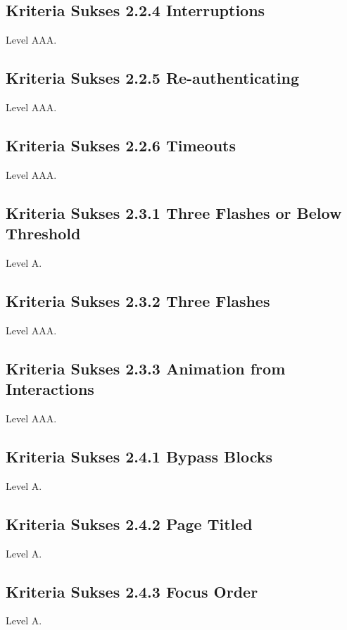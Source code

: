 \subsection{Kriteria Sukses 2.2.4 Interruptions}
\label{sec:kriteria_2.2.4}
Level AAA.

\subsection{Kriteria Sukses 2.2.5 Re-authenticating}
\label{sec:kriteria_2.2.5}
Level AAA.

\subsection{Kriteria Sukses 2.2.6 Timeouts}
\label{sec:kriteria_2.2.6}
Level AAA.

\subsection{Kriteria Sukses 2.3.1 Three Flashes or Below Threshold}
\label{sec:kriteria_2.3.1}
Level A.

\subsection{Kriteria Sukses 2.3.2 Three Flashes}
\label{sec:kriteria_2.3.2}
Level AAA.

\subsection{Kriteria Sukses 2.3.3 Animation from Interactions}
\label{sec:kriteria_2.3.3}
Level AAA.

\subsection{Kriteria Sukses 2.4.1 Bypass Blocks}
\label{sec:kriteria_2.4.1}
Level A.

\subsection{Kriteria Sukses 2.4.2 Page Titled}
\label{sec:kriteria_2.4.2}
Level A.

\subsection{Kriteria Sukses 2.4.3 Focus Order}
\label{sec:kriteria_2.4.3}
Level A.

